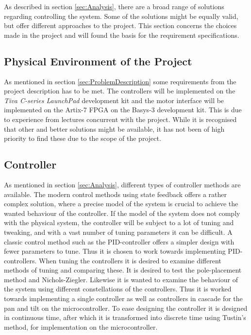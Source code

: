 \documentclass[../../main.tex]{subfiles}
\begin{document}
As described in section \ref{sec:Analysis}, there are a broad range of solutions regarding controlling the system. Some of the solutions might be equally valid, but offer different approaches to the project. This section concerns the choices made in the project and will found the basis for the requirement specifications.

\subsection*{Physical Environment of the Project}
As mentioned in section \ref{sec:ProblemDescription} some requirements from the project description has to be met. The controllers will be implemented on the \textit{Tiva C-series LaunchPad} development kit and the motor interface will be implemented on the Artix-7 FPGA on the Basys-3 development kit. This is due to experience from lectures concurrent with the project. While it is recognised that other and better solutions might be available, it has not been of high priority to find these due to the scope of the project. 



\subsection*{Controller}
As mentioned in section \ref{sec:Analysis}, different types of controller methods are available. The modern control methods using state feedback offers a rather complex solution, where a precise model of the system is crucial to achieve the wanted behaviour of the controller. If the model of the system does not comply with the physical system, the controller will be subject to a lot of tuning and tweaking, and with a vast number of tuning parameters it can be difficult. A classic control method such as the PID-controller offers a simpler design with fewer parameters to tune. Thus it is chosen to work towards implementing PID-controllers. When tuning the controllers it is desired to examine different methods of tuning and comparing these. It is desired to test the pole-placement method and Nichols-Ziegler. Likewise it is wanted to examine the behaviour of the system using different constellations of the controllers. Thus it is worked towards implementing a single controller as well as controllers in cascade for the pan and tilt on the microcontroller. 
To ease designing the controller it is designed in continuous time, after which it is transformed into discrete time using Tustin's method, for implementation on the microcontroller. 
\end{document}
